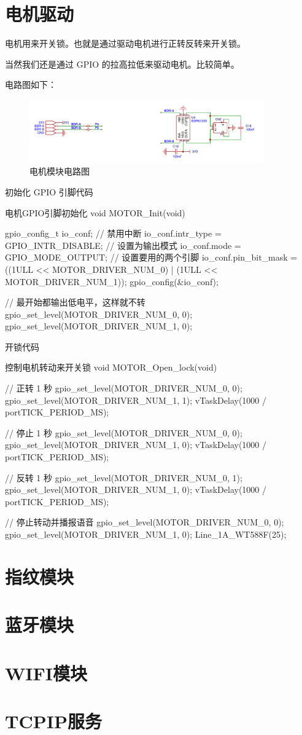 \documentclass[lang=cn,newtx,10pt,scheme=chinese]{elegantbook}
\begin{document}
\chapter{电机驱动}

电机用来开关锁。也就是通过驱动电机进行正转反转来开关锁。

当然我们还是通过 GPIO 的拉高拉低来驱动电机。比较简单。

电路图如下：

\begin{figure}[!htb]
\centering
\includegraphics[width=0.9\textwidth]{motor.png}
\caption{电机模块电路图}
\end{figure}

初始化 GPIO 引脚代码

\begin{mycode}{电机GPIO引脚初始化}
void MOTOR_Init(void)
{
    gpio_config_t io_conf;
    // 禁用中断
    io_conf.intr_type = GPIO_INTR_DISABLE;
    // 设置为输出模式
    io_conf.mode = GPIO_MODE_OUTPUT;
    // 设置要用的两个引脚
    io_conf.pin_bit_mask = ((1ULL << MOTOR_DRIVER_NUM_0) | (1ULL << MOTOR_DRIVER_NUM_1));
    gpio_config(&io_conf);

    // 最开始都输出低电平，这样就不转
    gpio_set_level(MOTOR_DRIVER_NUM_0, 0);
    gpio_set_level(MOTOR_DRIVER_NUM_1, 0);
}
\end{mycode}

开锁代码

\begin{mycode}{控制电机转动来开关锁}
void MOTOR_Open_lock(void)
{
    // 正转 1 秒
    gpio_set_level(MOTOR_DRIVER_NUM_0, 0);
    gpio_set_level(MOTOR_DRIVER_NUM_1, 1);
    vTaskDelay(1000 / portTICK_PERIOD_MS);

    // 停止 1 秒
    gpio_set_level(MOTOR_DRIVER_NUM_0, 0);
    gpio_set_level(MOTOR_DRIVER_NUM_1, 0);
    vTaskDelay(1000 / portTICK_PERIOD_MS);

    // 反转 1 秒
    gpio_set_level(MOTOR_DRIVER_NUM_0, 1);
    gpio_set_level(MOTOR_DRIVER_NUM_1, 0);
    vTaskDelay(1000 / portTICK_PERIOD_MS);

    // 停止转动并播报语音
    gpio_set_level(MOTOR_DRIVER_NUM_0, 0);
    gpio_set_level(MOTOR_DRIVER_NUM_1, 0);
    Line_1A_WT588F(25);
}
\end{mycode}

\chapter{指纹模块}

\chapter{蓝牙模块}

\chapter{WIFI模块}

\chapter{TCPIP服务}
\end{document}
